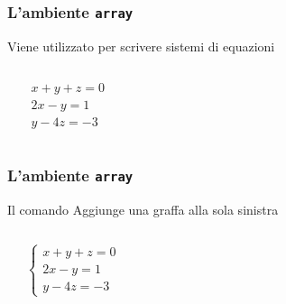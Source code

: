 \documentclass[svgnames,%
	ucs,%
	pdftex]{guitbeamer}
\begin{document}
\begin{frame}
  \frametitle{L'ambiente \texttt{array}}
	Viene utilizzato per scrivere sistemi di equazioni
  \begin{columns}
	\begin{LaTeXcode}
		\\[\n
		\alert{\\begin\{array\}\{l\}} \n
		\hspace*{5ex} x+y+z=0\bs\bs \n
		\hspace*{5ex} 2x-y=1\bs\bs \n
		\hspace*{5ex} y-4z=-3 \n
		\alert{\\end\{array\}} \n
		\\] 
	\end{LaTeXcode}
	\begin{LaTeXoutput}
		\vspace{4.6ex}
		\begin{displaymath} 
		\begin{array}{l}
		x+y+z=0\\
		2x-y=1\\
		y-4z=-3 
		\end{array} 
		\end{displaymath} 
		\vspace{4.6ex}
	\end{LaTeXoutput}
  \end{columns}
\end{frame}
\begin{frame}
  \frametitle{L'ambiente \texttt{array}}
	Il comando  Aggiunge una graffa alla sola sinistra
  \begin{columns}
	\begin{LaTeXcode}
		\\[\n
		\alert{\\left\bs\{} \n
		\\begin\{array\}\{l\} \n
		\hspace*{5ex} x+y+z=0\bs\bs \n
		\hspace*{5ex} 2x-y=1\bs\bs \n
		\hspace*{5ex} y-4z=-3 \n
		\\end\{array\} \n
		\alert{\\right.} \n
		\\]
	\end{LaTeXcode}
	\begin{LaTeXoutput}
		\vspace{5.6ex}
		\[
		\left\{
		\begin{array}{l}
		x+y+z=0\\
		2x-y=1\\
		y-4z=-3 
		\end{array} 
		\right. 
		\] 
		\vspace{5.6ex}
	\end{LaTeXoutput}
  \end{columns}
\end{frame}
\end{document}
